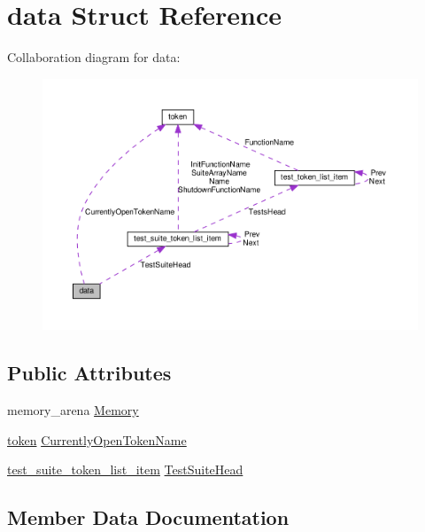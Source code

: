 \hypertarget{structdata}{}\section{data Struct Reference}
\label{structdata}


Collaboration diagram for data\+:
\nopagebreak
\begin{figure}[H]
\begin{center}
\leavevmode
\includegraphics[width=350pt]{d7/dcf/structdata__coll__graph}
\end{center}
\end{figure}
\subsection*{Public Attributes}
\begin{DoxyCompactItemize}
\item 
memory\+\_\+arena \hyperlink{structdata_ad3188e5c8551b604c9d2c3ddbf29a9b8}{Memory}
\item 
\hyperlink{structtoken}{token} \hyperlink{structdata_acd39ca2feac118a8faa8d82520494213}{Currently\+Open\+Token\+Name}
\item 
\hyperlink{structtest__suite__token__list__item}{test\+\_\+suite\+\_\+token\+\_\+list\+\_\+item} \hyperlink{structdata_a5bb01b3754cb4b3baf9b7f499022cd1e}{Test\+Suite\+Head}
\end{DoxyCompactItemize}


\subsection{Member Data Documentation}
\mbox{\label{structdata_acd39ca2feac118a8faa8d82520494213}} 

